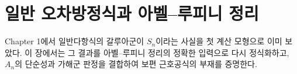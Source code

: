 \chapter{일반 오차방정식과 아벨--루피니 정리}
\label{chap:abel-ruffini}

Chapter 1에서 일반다항식의 갈루아군이 $S_n$이라는 사실을 첫 계산 모형으로 이미 보았다. 이 장에서는 그 결과를 아벨--루피니 정리의 정확한 입력으로 다시 정식화하고, $A_n$의 단순성과 가해군 판정을 결합하여 보편 근호공식의 부재를 증명한다.











